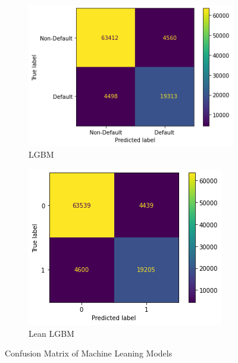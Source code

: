 \documentclass[twoside,11pt,a4paper]{article}
\begin{document}
\begin{figure}[h!]
\begin{subfigure}{0.4 \textwidth}
	\end{subfigure}
	\begin{subfigure}{0.4 \textwidth}
		\includegraphics[width=1\linewidth, height=0.8\linewidth]{cm_lgbm}
		\caption[Light Gradient Boosting Machine]{\acs{LGBM}}
		\label{fig:cm_lgbm}
	\end{subfigure}
	\hfill
		\begin{subfigure}{0.4 \textwidth}
		\includegraphics[width=1\linewidth, height=0.8\linewidth]{cm_lean_lgbm}
		\caption[Lean Light Gradient Boosting Machine]{Lean LGBM}
		\label{fig:cm_lean_lgbm}
	\end{subfigure}
	\caption[Confusion Matrix of Machine Leaning Models]{Confusion Matrix of Machine Leaning Models}
	\label{fig:cm_ml}
\end{figure}
\end{document}
